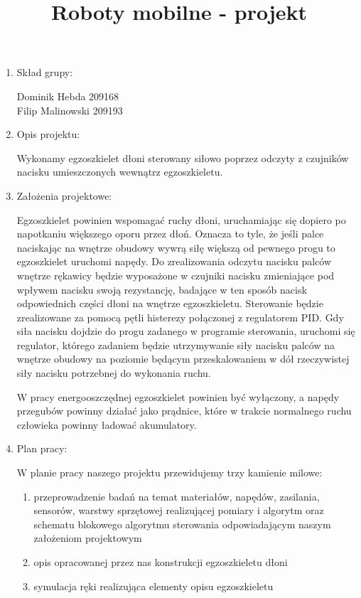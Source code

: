 \documentclass[a4paper]{article}
\title{Roboty mobilne - projekt}
\date{}
\begin{document}
\maketitle

\begin{enumerate}

\item Skład grupy:

Dominik Hebda 209168 \\
Filip Malinowski 209193

\item Opis projektu:

Wykonamy egzoszkielet dłoni sterowany siłowo poprzez odczyty z czujników nacisku umieszczonych wewnątrz egzoszkieletu.

\item Założenia projektowe:

Egzoszkielet powinien wspomagać ruchy dłoni, uruchamiając się dopiero po napotkaniu większego oporu przez dłoń. Oznacza to tyle, że jeśli palce naciskając na wnętrze obudowy wywrą siłę większą od pewnego progu to egzoszkielet uruchomi napędy.
Do zrealizowania odczytu nacisku palców wnętrze rękawicy będzie wyposażone w czujniki nacisku zmieniające pod wpływem nacisku swoją rezystancję, badające w ten sposób nacisk odpowiednich części dłoni na wnętrze egzoszkieletu.
Sterowanie będzie zrealizowane za pomocą pętli histerezy połączonej z regulatorem PID. Gdy siła nacisku dojdzie do progu zadanego w programie sterowania, uruchomi się regulator, którego zadaniem będzie utrzymywanie siły nacisku palców na wnętrze obudowy na poziomie będącym przeskalowaniem w dół rzeczywistej siły nacisku potrzebnej do wykonania ruchu.

W pracy energooszczędnej egzoszkielet powinien być wyłączony, a napędy przegubów powinny działać jako prądnice, które w trakcie normalnego ruchu człowieka powinny ładować akumulatory.

\item Plan pracy:

W planie pracy naszego projektu przewidujemy trzy kamienie milowe:
\begin{enumerate}[I -]
\item przeprowadzenie badań na temat materiałów, napędów, zasilania, sensorów, warstwy sprzętowej realizującej pomiary i algorytm oraz schematu blokowego algorytmu sterowania odpowiadającym naszym założeniom projektowym
\item opis opracowanej przez nas konstrukcji egzoszkieletu dłoni
\item symulacja ręki realizująca elementy opisu egzoszkieletu
\end{enumerate}


\end{enumerate}
\end{document}
